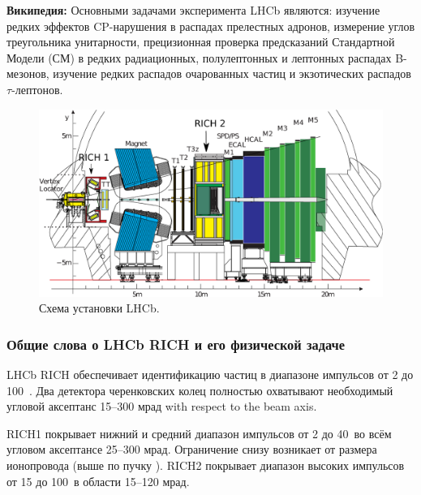 
\textbf{Википедия:}
Основными задачами эксперимента LHCb являются: изучение редких эффектов CP-нарушения в распадах прелестных адронов, измерение углов треугольника унитарности, прецизионная проверка предсказаний Стандартной Модели (СМ) в редких радиационных, полулептонных и лептонных распадах B-мезонов, изучение редких распадов очарованных частиц и экзотических распадов $\tau$-лептонов.

\begin{figure}[H]
\centering
\includegraphics[width=1.0\textwidth]{pictures/LHCb.png}
\caption{Схема установки LHCb.}
\label{fig:LHCb}
\end{figure}

\subsubsection{Общие слова о LHCb RICH и его физической задаче}

LHCb RICH обеспечивает идентификацию частиц в диапазоне импульсов от 2 до 100~\GeVoverC. Два детектора черенковских колец полностью охватывают необходимый угловой аксептанс 15--300 мрад with respect to the beam axis.

RICH1 покрывает нижний и средний диапазон импульсов от 2 до 40~\GeVoverC во всём угловом аксептансе 25--300 мрад. Ограничение снизу возникает от размера ионопровода (выше по пучку \todo). RICH2 покрывает диапазон высоких импульсов от 15 до 100~\GeVoverC в области 15--120 мрад.

